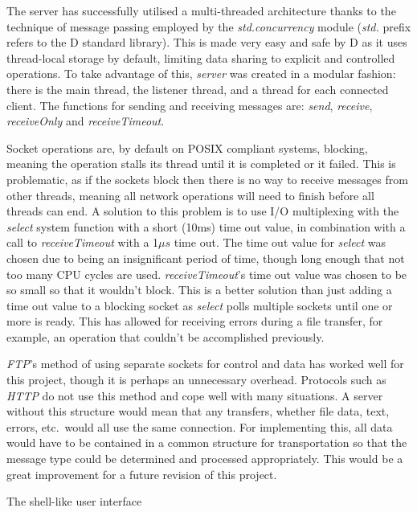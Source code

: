 \documentclass[a4paper]{article}
\begin{document}
The server has successfully utilised a multi-threaded architecture thanks to the technique of message passing employed by the \textit{std.concurrency} module (\textit{std.} prefix refers to the D standard library). This is made very easy and safe by D as it uses thread-local storage by default, limiting data sharing to explicit and controlled operations. To take advantage of this, \textit{server} was created in a modular fashion: there is the main thread, the listener thread, and a thread for each connected client. The functions for sending and receiving messages are: \textit{send}, \textit{receive}, \textit{receiveOnly} and \textit{receiveTimeout}.

Socket operations are, by default on POSIX compliant systems, blocking, meaning the operation stalls its thread until it is completed or it failed. This is problematic, as if the sockets block then there is no way to receive messages from other threads, meaning all network operations will need to finish before all threads can end.
A solution to this problem is to use I/O multiplexing with the \textit{select} system function with a short (10ms) time out value, in combination with a call to \textit{receiveTimeout} with a 1$\mu s$ time out. The time out value for \textit{select} was chosen due to being an insignificant period of time, though long enough that not too many CPU cycles are used. \textit{receiveTimeout}'s time out value was chosen to be so small so that it wouldn't block. This is a better solution than just adding a time out value to a blocking socket as \textit{select} polls multiple sockets until one or more is ready. This has allowed for receiving errors during a file transfer, for example, an 
operation that couldn't be accomplished previously.

\textit{FTP}'s method of using separate sockets for control and data has worked well for this project, though it is perhaps an unnecessary overhead. Protocols such as \textit{HTTP} do not use this method and cope well with many situations. A server without this structure would mean that any transfers, whether file data, text, errors, etc.\ would all use the same connection. For implementing this, all data would have to be contained in a common structure for transportation so that the message type could be determined and processed appropriately. This would be a great improvement for a future revision of this project.

The shell-like user interface 


\printbibliography
\end{document}

